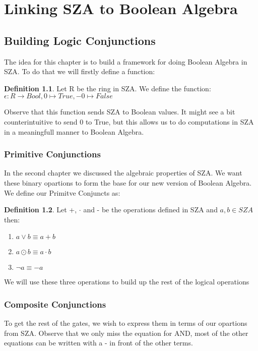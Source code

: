 \documentclass[12pt]{report}
\theoremstyle{definition}
\newtheorem{definition}{Definition}[section]
\theoremstyle{remark}
\begin{document}
\chapter{Linking SZA to Boolean Algebra}
  \section{Building Logic Conjunctions}
    The idea for this chapter is to build a framework for doing Boolean Algebra in SZA. To do that we will firstly define a function:

    \begin{definition}
      Let R be the ring in SZA. We define the function:\\ $\epsilon: R \rightarrow Bool, 0\mapsto True, -0\mapsto False$
    \end{definition}

    Observe that this function sends SZA to Boolean values. It might see a bit counterintuitive to send 0 to True, but this allows us to do computations in SZA in a meaningfull manner to Boolean Algebra.

    \subsection{Primitive Conjunctions}
      In the second chapter we discussed the algebraic properties of SZA. We want these binary opartions to form the base for our new version of Boolean Algebra. We define our Primitve Conjuncts as:

      \begin{definition}
        Let +, $\cdot$ and - be the operations defined in SZA and $a,b\in SZA$ then:
        \begin{enumerate}
          \item $a\vee b\equiv a+b$
          \item $a\odot b\equiv a\cdot b$
          \item  $\neg a\equiv -a$
        \end{enumerate}
      \end{definition}

      We will use these three operations to build up the rest of the logical operations

    \newpage

    \subsection{Composite Conjunctions}
      To get the rest of the gates, we wish to express them in terms of our opartions from SZA. Observe that we only miss the equation for AND, most of the other equations can be written with a - in front of the other terms.
\end{document}
